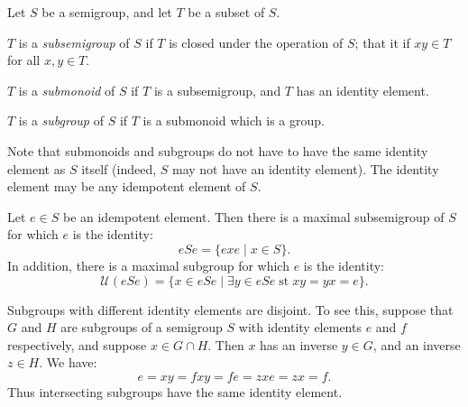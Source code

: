 \documentclass[12pt]{article}
\begin{document}
Let $S$ be a semigroup, and let $T$ be a subset of $S$.

$T$ is a \emph{subsemigroup} of $S$ if $T$ is closed under the operation of $S$; that it if $xy \in T$ for all $x, y \in T$.

$T$ is a \emph{submonoid} of $S$ if $T$ is a subsemigroup, and $T$ has an identity element.

$T$ is a \emph{subgroup} of $S$ if $T$ is a submonoid which is a group.

Note that submonoids and subgroups do not have to have the same identity element as $S$ itself (indeed, $S$ may not have an identity element).  The identity element may be any idempotent element of $S$.

Let $e \in S$ be an idempotent element.  Then there is a maximal subsemigroup of $S$ for which $e$ is the identity:
$$eSe = \{ exe \mid x \in S \}.$$
In addition, there is a maximal subgroup for which $e$ is the identity:
$$\mathcal{U}(eSe) = \{x \in eSe \mid \exists y \in eSe \;\text{st}\; xy=yx=e \}.$$

Subgroups with different identity elements are disjoint.  To see this, suppose that $G$ and $H$ are subgroups of a semigroup $S$ with identity elements $e$ and $f$ respectively, and suppose $x \in G \cap H$.
Then $x$ has an inverse $y \in G$, and an inverse $z \in H$.  We have:
$$e = xy = fxy = fe = zxe = zx = f.$$
Thus intersecting subgroups have the same identity element.
\end{document}
